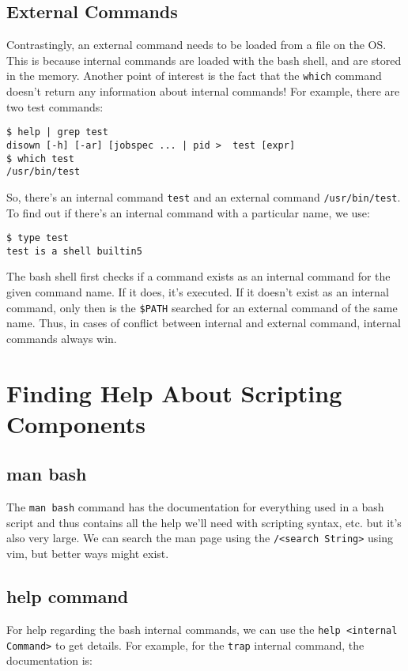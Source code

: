 \subsection{External Commands}
Contrastingly, an external command needs to be loaded from a file on the OS. This is because internal commands are loaded with the bash shell, and are stored in the memory. Another point of interest is the fact that the \verb|which| command doesn't return any information about internal commands! For example, there are two test commands:

\vspace{-15pt}
\begin{verbatim}
$ help | grep test
disown [-h] [-ar] [jobspec ... | pid >  test [expr]
$ which test
/usr/bin/test
\end{verbatim}
\vspace{-10pt}	

\noindent
So, there's an internal command \verb|test| and an external command \verb|/usr/bin/test|. To find out if there's an internal command with a particular name, we use:

\vspace{-15pt}
\begin{verbatim}
$ type test
test is a shell builtin5
\end{verbatim}
\vspace{-10pt}	

\noindent
The bash shell first checks if a command exists as an internal command for the given command name. If it does, it's executed. If it doesn't exist as an internal command, only then is the \verb|$PATH| searched for an external command of the same name. Thus, in cases of conflict between internal and external command, internal commands always win. 

\section{Finding Help About Scripting Components}
\subsection{man bash}	
The \verb|man bash| command has the documentation for everything used in a bash script and thus contains all the help we'll need with scripting syntax, etc. but it's also very large. We can search the man page using the \verb|/<search String>| using vim, but better ways might exist. 

\subsection{help command}
For help regarding the bash internal commands, we can use the \verb|help <internal Command>| to get details. For example, for the \verb|trap| internal command, the documentation is:

